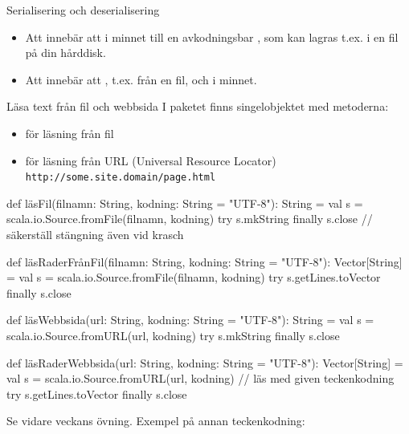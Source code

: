 


\begin{Slide}{Serialisering och deserialisering}
\begin{itemize}
  \item Att  innebär att  i minnet till en avkodningsbar , som kan lagras t.ex. i en fil på din hårddisk.
  \item Att  innebär att , t.ex. från en fil, och  i minnet.
\end{itemize}
\end{Slide}


\begin{Slide}{Läsa text från fil och webbsida}\SlideFontSmall
I paketet  finns singelobjektet  med metoderna:
\begin{itemize}\SlideFontTiny
  \item  {} för läsning från fil
  \item {} för läsning från URL (Universal Resource Locator) \\\texttt{http://some.site.domain/page.html}

\end{itemize}
\begin{CodeSmall}
def läsFil(filnamn: String, kodning: String = "UTF-8"): String = 
  val s = scala.io.Source.fromFile(filnamn, kodning)
  try s.mkString finally s.close // säkerställ stängning även vid krasch

def läsRaderFrånFil(filnamn: String, kodning: String = "UTF-8"): Vector[String] =
  val s = scala.io.Source.fromFile(filnamn, kodning)
  try s.getLines.toVector finally s.close 

def läsWebbsida(url: String, kodning: String = "UTF-8"): String = 
  val s = scala.io.Source.fromURL(url, kodning)
  try s.mkString finally s.close

def läsRaderWebbsida(url: String, kodning: String = "UTF-8"): Vector[String] =
  val s = scala.io.Source.fromURL(url, kodning) // läs med given teckenkodning
  try s.getLines.toVector finally s.close 

\end{CodeSmall}
{\SlideFontTiny Se vidare veckans övning. Exempel på annan teckenkodning:  }
\end{Slide}


